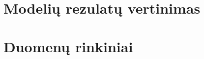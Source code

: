 \documentclass{VUMIFPSbakalaurinis}
\begin{document}
\section{Modelių rezulatų vertinimas}

\section{Duomenų rinkiniai}



\



\end{document}
